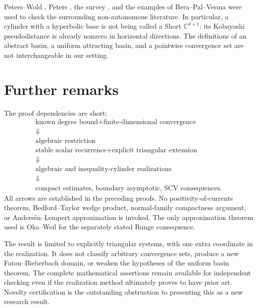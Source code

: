 \documentclass[12pt]{amsart}
\theoremstyle{definition}
\theoremstyle{remark}
\numberwithin{equation}{section}
\newcommand{\C}{\mathbb{C}}
\begin{document}
Peters--Wold \cite{PW-en}, Peters \cite{Peters-en}, the survey \cite{Survey-en}, and the examples of Bera--Pal--Verma \cite{BPV-en} were used to check the surrounding non-autonomous literature. In particular, a cylinder with a hyperbolic base is not being called a Short $\C^{d+1}$: its Kobayashi pseudodistance is already nonzero in horizontal directions. The definitions of an abstract basin, a uniform attracting basin, and a pointwise convergence set are not interchangeable in our setting.

\section{Further remarks}
The proof dependencies are short:
\[
\begin{array}{c}
\text{known degree bound}+\text{finite-dimensional convergence}\\
\Downarrow\\
\text{algebraic restriction}\\[3pt]
\text{stable scalar recurrence}+\text{explicit triangular extension}\\
\Downarrow\\
\text{algebraic and inequality-cylinder realizations}\\
\Downarrow\\
\text{compact estimates, boundary asymptotic, SCV consequences}.
\end{array}
\]
All arrows are established in the preceding proofs. No positivity-of-currents theorem, Bedford--Taylor wedge product, normal-family compactness argument, or Anders\'en--Lempert approximation is invoked. The only approximation theorem used is Oka--Weil for the separately stated Runge consequence.

The result is limited to explicitly triangular systems, with one extra coordinate in the realization. It does not classify arbitrary convergence sets, produce a new Fatou--Bieberbach domain, or weaken the hypotheses of the uniform basin theorem. The complete mathematical assertions remain available for independent checking even if the realization method ultimately proves to have prior art. Novelty certification is the outstanding obstruction to presenting this as a new research result.
\end{document}
